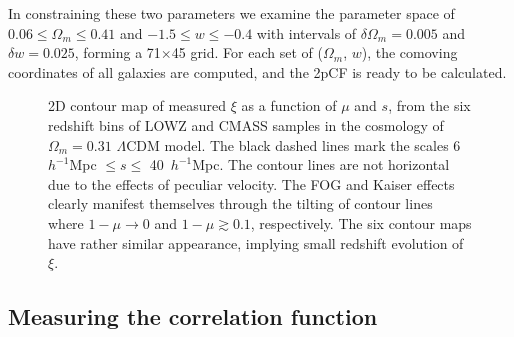 \documentclass[iop]{emulateapj}
\begin{document}
In constraining these two parameters we examine the parameter space of 
$0.06\leq \Omega_m\leq 0.41$ and $-1.5 \leq w \leq -0.4$ with intervals of 
$\delta \Omega_m = 0.005$ and $\delta w = 0.025$,
forming a 71$\times$45 grid.
For each set of ($\Omega_m$, $w$), 
the comoving coordinates of all galaxies are computed, 
and the 2pCF is ready to be calculated.

\begin{figure*}
   \caption{
    \label{fig_2pcfcon} 
    2D contour map of measured $\xi$ as a function of $\mu$ and $s$, from the six redshift bins of LOWZ and CMASS samples 
      in the cosmology of $\Omega_m=0.31$ $\Lambda$CDM model.
    The black dashed lines mark the scales 6\ $h^{-1}$Mpc $\leq s\leq$ 40\ $h^{-1}$Mpc.
    The contour lines are not horizontal due to the effects of peculiar velocity.
    The FOG and Kaiser effects clearly manifest themselves through the tilting of contour 
     lines where $1-\mu \rightarrow 0$ and $1-\mu \gtrsim0.1$, respectively.
    The six contour maps have rather similar appearance, implying small redshift evolution of $\xi$.
   }
\end{figure*}

\subsection{Measuring the correlation function}
\end{document}
